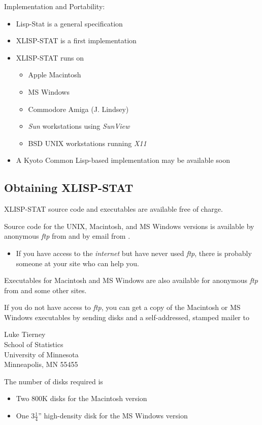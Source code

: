 \begin{slide}{}
Implementation and Portability:
\begin{itemize}
\item Lisp-Stat is a general specification
\item XLISP-STAT is a first implementation
\item XLISP-STAT runs on
\begin{itemize}
\item Apple Macintosh
\item MS Windows
\item Commodore Amiga (J. Lindsey)
\item {\em Sun}\/ workstations using {\em SunView}
\item BSD UNIX workstations running {\em X11}
\end{itemize}
\item A Kyoto Common Lisp-based implementation may be available soon
\end{itemize}
\end{slide}

\begin{slide}{}
\section{Obtaining XLISP-STAT}
XLISP-STAT source code and executables are available free of charge.

Source code for the UNIX, Macintosh, and MS Windows versions is
available by anonymous {\em ftp}\/ from 
and by email from .

\begin{itemize}
\item[]
If you have access to the {\em internet}\/ but have never used {\em
ftp}, there is probably someone at your site who can help you.
\end{itemize}

Executables for Macintosh and MS Windows are also available for
anonymous {\em ftp}\/ from  and some other
sites.
\end{slide}

\begin{slide}{}
If you do not have access to {\em ftp}, you can get a copy of the
Macintosh or MS Windows executables by sending disks and a self-addressed,
stamped mailer to
\begin{center}
\parbox{4in}{\raggedright
Luke Tierney\\
School of Statistics\\
University of Minnesota\\
Minneapolis, MN 55455}
\end{center}
The number of disks required is
\begin{itemize}
\item[] Two 800K disks for the Macintosh version
\item[] One $3\frac{1}{4}$'' high-density disk for the MS Windows version
\end{itemize}
\end{slide}

